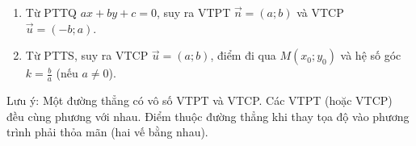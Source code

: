 \begin{enumerate}
\item Từ PTTQ $ax+by+c=0$, suy ra VTPT $\overrightarrow{n}=(a;b)$ và VTCP $\overrightarrow{u}=(-b;a)$.
\item Từ PTTS, suy ra VTCP $\overrightarrow{u}=(a;b)$, điểm đi qua $M(x_0; y_0)$ và hệ số góc $k = \frac{b}{a}$ (nếu $a \neq 0$).
\end{enumerate}
Lưu ý: Một đường thẳng có vô số VTPT và VTCP. Các VTPT (hoặc VTCP) đều cùng phương với nhau. Điểm thuộc đường thẳng khi thay tọa độ vào phương trình phải thỏa mãn (hai vế bằng nhau).
